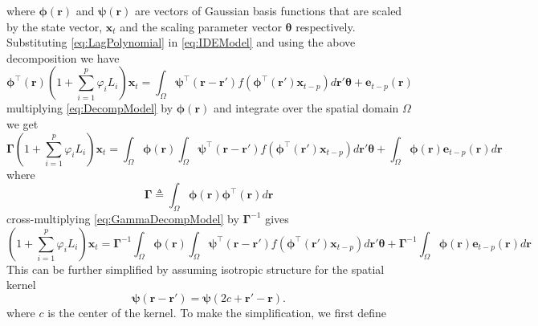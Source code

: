 \documentclass[a4paper,10pt]{article}
\begin{document}
where $\mathbf{\boldsymbol{\phi}}(\mathbf{r})$ and $\mathbf{\boldsymbol{\psi}}(\mathbf{r})$ are  vectors of Gaussian basis functions that are scaled by the state vector, $\mathbf{x}_t$ and the scaling parameter vector $\boldsymbol\theta$ respectively. Substituting \eqref{eq:LagPolynomial} in \eqref{eq:IDEModel} and using the above decomposition we have
\begin{equation}\label{eq:DecompModel}
\boldsymbol{\phi}^{\top}\left(\mathbf{r}\right)(1+\sum_{i=1}^{p}\varphi_i L_i) \mathbf{x}_t=\int_{\Omega}\boldsymbol{\psi}^\top\left(\mathbf{r}-\mathbf{r}'\right) f(\boldsymbol{\phi}^{\top}\left(\mathbf{r'}\right) \mathbf{x}_{t-p})d\mathbf r'\boldsymbol{\theta}+\mathbf e_{t-p}(\mathbf r)
 \end{equation}
multiplying \eqref{eq:DecompModel} by $\boldsymbol \phi(\mathbf r)$ and integrate over the spatial domain $\Omega$ we get
\begin{equation}\label{eq:GammaDecompModel}
 \boldsymbol \Gamma (1+\sum_{i=1}^{p}\varphi_i L_i) \mathbf{x}_t=\int_{\Omega}\boldsymbol \phi(\mathbf r)\int_{\Omega}\boldsymbol{\psi}^\top\left(\mathbf{r}-\mathbf{r}'\right) f(\boldsymbol{\phi}^{\top}\left(\mathbf{r'}\right) \mathbf{x}_{t-p})d\mathbf r'\boldsymbol{\theta}+\int_{\Omega}\boldsymbol\phi(\mathbf r)\mathbf e_{t-p}(\mathbf r)d\mathbf r
\end{equation}
where 
\begin{equation}\label{eq:DefGamma}
	\boldsymbol{\Gamma} \triangleq \int_\Omega {\boldsymbol{\phi} \left(\mathbf{r}\right)\boldsymbol{\phi} ^{\top}\left(\mathbf{r}\right)d\mathbf{r}} 
\end{equation}
cross-multiplying \eqref{eq:GammaDecompModel} by $\boldsymbol{\Gamma}^{-1}$ gives
\begin{equation}\label{eq:InvGammaDecompModel}
 (1+\sum_{i=1}^{p}\varphi_i L_i) \mathbf{x}_t=\boldsymbol\Gamma^{-1}\int_{\Omega}\boldsymbol \phi(\mathbf r)\int_{\Omega}\boldsymbol{\psi}^\top\left(\mathbf{r}-\mathbf{r}'\right) f(\boldsymbol{\phi}^{\top}\left(\mathbf{r'}\right) \mathbf{x}_{t-p})d\mathbf r'\boldsymbol{\theta}+\boldsymbol\Gamma^{-1}\int_{\Omega}\boldsymbol\phi(\mathbf r)\mathbf e_{t-p}(\mathbf r)d\mathbf r
\end{equation}
This can be further simplified by assuming isotropic structure for the spatial kernel
\begin{equation}
	\boldsymbol{\psi} (\mathbf{r}-\mathbf{r}') = \boldsymbol{\psi} (2c+\mathbf{r}'-\mathbf{r}).
\end{equation}
where $c$ is the center of the kernel. To make the simplification, we first define
\end{document}
